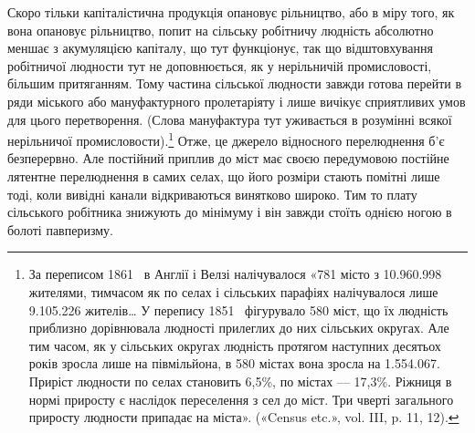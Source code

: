 Скоро тільки капіталістична продукція опановує рільництво, або в міру того, як вона опановує
рільництво, попит на сільську робітничу людність абсолютно меншає з акумуляцією капіталу, що тут
функціонує, так що відштовхування робітничої людности
тут не доповнюється, як у нерільничій промисловості, більшим притяганням. Тому частина сільської
людности завжди готова перейти в ряди міського або мануфактурного пролетаріяту і лише вичікує
сприятливих умов для цього перетворення. (Слова мануфактура тут уживається в розумінні всякої
нерільничої
промисловости).\footnote{
За переписом 1861~ в Англії і Велзі налічувалося «781 місто з \num{10.960.998} жителями, тимчасом як
по селах і сільських парафіях налічувалося лише \num{9.105.226} жителів\dots{} У перепису 1851~ фігурувало
580 міст, що їх людність приблизно дорівнювала людності прилеглих до них
сільських округах. Але тим часом, як у сільських округах людність протягом наступних десятьох років
зросла лише на півмільйона, в 580 містах вона зросла на \num{1.554.067}. Приріст людности по селах
становить 6,5\%, по містах — 17,3\%. Ріжниця в нормі приросту є наслідок переселення з сел до міст.
Три чверті загального приросту людности припадає на міста». («Census etc.», vol. III, p. 11, 12).
} Отже, це джерело відносного перелюднення
б’є безперервно. Але постійний приплив до міст має своєю передумовою постійне лятентне перелюднення
в самих селах, що його розміри стають помітні лише тоді, коли вивідні канали відкриваються винятково
широко. Тим то плату сільського робітника
знижують до мінімуму і він завжди стоїть однією ногою в болоті павперизму.

